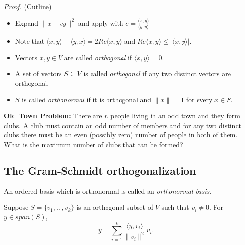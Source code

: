 \documentclass[12pt]{article}
\newenvironment{theorem}[2][Theorem]{\begin{trivlist}
\item[\hskip \labelsep {\bfseries #1}\hskip \labelsep {\bfseries #2.}]}{\end{trivlist}}
\newenvironment{definition}[2][Definition]{\begin{trivlist}
\item[\hskip \labelsep {\bfseries #1}\hskip \labelsep {\bfseries #2}]}{\end{trivlist}}
\begin{document}
\textit{Proof.} (Outline)

\begin{itemize}
    \item[(c)] Expand $\lVert x - cy\rVert^2$ and apply with $c = \frac{\langle x, y \rangle}{\langle y, y \rangle}$
    
    \item[(d)] Note that $\langle x, y \rangle + \langle y, x \rangle = 2Re\langle x, y \rangle$ and $Re\langle x, y \rangle \leq \lvert \langle x, y \rangle \rvert$.
\end{itemize}

\begin{definition}{4} \textit{ }
\begin{itemize}
    \item Vectors $x,y \in V$ are called \textit{orthogonal} if $\langle x, y \rangle = 0$.
    
    \item A set of vectors $S \subseteq V$ is called \textit{orthogonal} if any two distinct vectors are orthogonal.
    
    \item $S$ is called \textit{orthonormal} if it is orthogonal and $\lVert x \rVert = 1$ for every $x \in S$.
\end{itemize}
\end{definition}

\textbf{Old Town Problem:} There are $n$ people living in an odd town and they form clubs. A club must contain an odd number of members and for any two distinct clubs there must be an even (possibly zero) number of people in both of them. What is the maximum number of clubs that can be formed?

\subsection{The Gram-Schmidt orthogonalization}

\begin{definition}{5}
An ordered basis which is orthonormal is called an \textit{orthonormal basis}.
\end{definition}

\begin{theorem}{6.3}
Suppose $S = \{v_1, \dots, v_k\}$ is an orthogonal subset of $V$ such that $v_i \neq 0$. For $y \in span(S)$, $$y = \sum_{i = 1}^k\frac{\langle y, v_i \rangle}{\lVert v_i \rVert^2}v_i.$$
\end{theorem}
\end{document}
